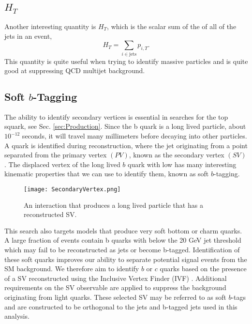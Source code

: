 
\subsection{$H_T$}\label{HT}
Another interesting quantity is $H_T$, which is the scalar sum of the \pt{} of all of the jets in an event,
\begin{equation}
H_T=\sum_{i\in\text{jets}}p_{i,T}.
\end{equation}
This quantity is quite useful when trying to identify massive particles and is quite good at suppressing QCD multijet background.

\subsection{Soft $b$-Tagging}\label{SV}

The ability to identify secondary vertices is essential in searches for the top squark, see Sec. \ref{sec:Production}. Since the b quark is a long lived particle, about $10^{-12}$ seconds, it will travel many millimeters before decaying into other particles. A \B{} quark is identified during reconstruction, where the jet originating from a point separated from the primary vertex $(PV)$, known as the secondary vertex $(SV)$. The displaced vertex of the long lived $b$ quark with low \pt{} has many interesting kinematic properties that we can use to identify them, known as soft $b$-tagging. 

\begin{figure}
 	\centering
	\texttt{[image: SecondaryVertex.png]}
 	\caption[Secondary Vertex Diagram]{An interaction that produces a long lived particle that has a reconstructed SV.}
 	\label{SecondaryVertex} 
\end{figure}

This search also targets models that produce very soft bottom or charm quarks. A large fraction of events contain b quarks with \pt{} below the 20 GeV jet threshold which may fail to be reconstructed as jets or become b-tagged. Identification of these soft quarks improves our ability to separate potential signal events from the SM background. We therefore aim to identify $b$ or $c$ quarks based on the presence of a SV reconstructed using the Inclusive Vertex Finder (IVF) \cite{noauthor_https://twiki.cern.ch/twiki/bin/view/main/inclusivesecondaryvertexfinder_nodate, fruehwirth_new_2003}. Additional requirements on the SV observable are applied to suppress the background originating from light quarks. These selected SV may be referred to as soft $b$-tags and are constructed to be orthogonal to the jets and b-tagged jets used in this analysis. 

